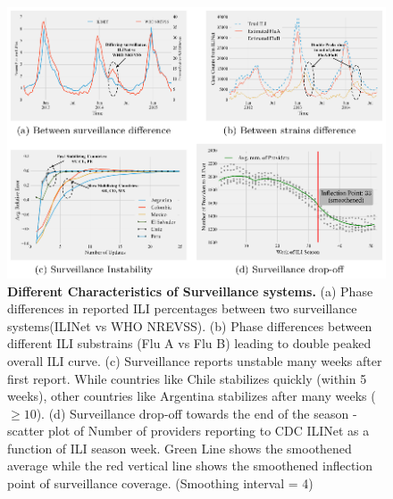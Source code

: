 \documentclass[10pt,letterpaper]{article}
\begin{document}

\begin{figure}[!h]
  \centering
  \includegraphics[width=0.96\linewidth]{./figs/char_figs.eps}

  \caption{\textbf{Different Characteristics of Surveillance systems.}
  (a)  Phase differences in reported ILI percentages between two 
  surveillance systems(ILINet vs WHO NREVSS).
  (b)  Phase differences between different ILI substrains 
  (Flu A vs Flu B) leading to double peaked overall ILI curve.
  (c) Surveillance reports unstable many weeks after first report.
  While countries like Chile stabilizes quickly (within 5 weeks), 
  other countries like Argentina stabilizes after many weeks ($\geq 10$). 
  (d) Surveillance drop-off towards the end of the season - scatter plot of 
  Number of providers reporting to CDC ILINet as a function of ILI season 
  week. Green Line shows the smoothened average while the red vertical
  line shows the smoothened inflection point of surveillance coverage. 
  (Smoothing interval = 4)
  \label{fig1}
  }
\end{figure}
\end{document}
